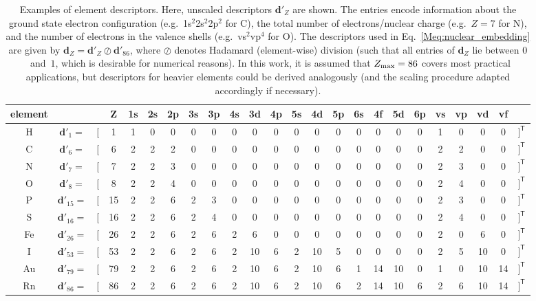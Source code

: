 \documentclass[%
superscriptaddress,
reprint,
nofootinbib,
amsmath,amssymb,amsfonts,
floatfix,
altaffilletter,
showkeys,
]{revtex4-2}
\begin{document}
\begin{table*}
	\begin{tabular}{c c c c c c c c c c c c c c c c c c c c c c c c}
		\toprule
		element & & & Z & 1s & 2s & 2p & 3s & 3p & 4s &  3d & 4p & 5s & 4d & 5p & 6s & 4f & 5d & 6p & vs & vp & vd & vf & \\
		\midrule
		H & $\mathbf{d}'_{1} =$ & $[$ & 1 & 1 & 0 & 0 & 0 & 0 & 0 &  0 & 0 & 0 &  0 & 0 & 0 &  0 &  0 & 0 & 1 & 0 &  0 &  0 & $]^{\mathsf{T}}$\\
		C & $\mathbf{d}'_{6} =$ & $[$ & 6 & 2 & 2 & 2 & 0 & 0 & 0 &  0 & 0 & 0 &  0 & 0 & 0 &  0 &  0 & 0 & 2 & 2 &  0 &  0 & $]^{\mathsf{T}}$\\
		N & $\mathbf{d}'_{7} =$ & $[$ & 7 & 2 & 2 & 3 & 0 & 0 & 0 &  0 & 0 & 0 &  0 & 0 & 0 &  0 &  0 & 0 & 2 & 3 &  0 &  0 & $]^{\mathsf{T}}$\\
		O & $\mathbf{d}'_{8} =$ & $[$ & 8 & 2 & 2 & 4 & 0 & 0 & 0 &  0 & 0 & 0 &  0 & 0 & 0 &  0 &  0 & 0 & 2 & 4 &  0 &  0 & $]^{\mathsf{T}}$\\
		P & $\mathbf{d}'_{15} =$ & $[$ & 15 & 2 & 2 & 6 & 2 & 3 & 0 &  0 & 0 & 0 &  0 & 0 & 0 &  0 &  0 & 0 & 2 & 3 &  0 &  0 & $]^{\mathsf{T}}$\\
		S & $\mathbf{d}'_{16} =$ & $[$ & 16 & 2 & 2 & 6 & 2 & 4 & 0 &  0 & 0 & 0 &  0 & 0 & 0 &  0 &  0 & 0 & 2 & 4 &  0 &  0 & $]^{\mathsf{T}}$\\
		Fe & $\mathbf{d}'_{26} =$ & $[$ & 26 & 2 & 2 & 6 & 2 & 6 & 2 &  6 & 0 & 0 &  0 & 0 & 0 &  0 &  0 & 0 & 2 & 0 &  6 &  0 & $]^{\mathsf{T}}$\\
		I & $\mathbf{d}'_{53} =$ & $[$ & 53 & 2 & 2 & 6 & 2 & 6 & 2 & 10 & 6 & 2 & 10 & 5 & 0 &  0 &  0 & 0 & 2 & 5 & 10 &  0 & $]^{\mathsf{T}}$\\
		Au & $\mathbf{d}'_{79} =$ & $[$ & 79 & 2 & 2 & 6 & 2 & 6 & 2 & 10 & 6 & 2 & 10 & 6 & 1 & 14 & 10 & 0 & 1 & 0 & 10 & 14 & $]^{\mathsf{T}}$\\
		Rn & $\mathbf{d}'_{86} =$ & $[$ & 86 & 2 & 2 & 6 & 2 & 6 & 2 & 10 & 6 & 2 & 10 & 6 & 2 & 14 & 10 & 6 & 2 & 6 & 10 & 14 & $]^{\mathsf{T}}$\\
		\bottomrule
	\end{tabular}
	\caption{Examples of element descriptors. Here, unscaled descriptors $\mathbf{d}'_Z$ are shown. The entries encode information about the ground state electron configuration (e.g.\ 1s$^2$2s$^2$2p$^2$ for C), the total number of electrons/nuclear charge (e.g.\ $Z=7$ for N), and the number of electrons in the valence shells (e.g.\ vs$^2$vp$^4$ for O). The descriptors used in Eq.~\ref{Meq:nuclear_embedding} are given by $\mathbf{d}_Z=\mathbf{d}'_Z\oslash\mathbf{d}'_{86}$, where $\oslash$ denotes Hadamard (element-wise) division (such that all entries of $\mathbf{d}_Z$ lie between $0$~and~$1$, which is desirable for numerical reasons). In this work, it is assumed that $Z_{\rm max}=86$ covers most practical applications, but descriptors for heavier elements could be derived analogously (and the scaling procedure adapted accordingly if necessary).}
	\label{tab:species_descriptor}
\end{table*}
\end{document}
